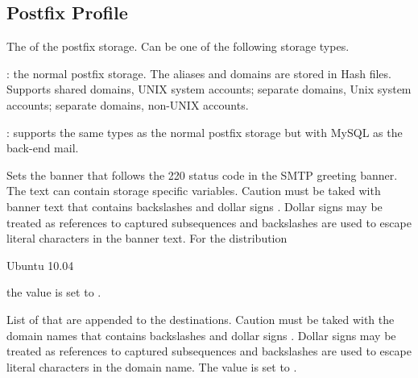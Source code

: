 \label{sec:postfix_profile}
\subsection{Postfix Profile}


The  of the postfix storage. Can be one of the following 
storage types.
\begin{asparaitem}
%
\item[\qcode{hash}:] 
the normal postfix storage. The aliases and domains are stored in Hash files.
Supports shared domains, UNIX system accounts;
separate domains, Unix system accounts; separate domains, non-UNIX accounts.
%
\item[\qcode{postfix}:] supports the same types as the normal 
postfix storage but with MySQL as the back-end mail.
%
\end{asparaitem}


Sets the banner  that follows the 220 status code in the SMTP 
greeting banner. The text can contain storage specific variables. Caution
must be taked with banner text that contains backslashes \qcode{\textbackslash} and 
dollar signs \qcode{\$}. Dollar signs may be treated as references to 
captured subsequences and backslashes are used to escape literal characters 
in the banner text.
For the distribution
\begin{inparaitem}
\item[\TheDistribution{ubuntu}] Ubuntu 10.04
\end{inparaitem}
the value is set to .


List of  that are appended to the destinations.
Caution must be taked with the domain names that contains backslashes \qcode{\textbackslash} and 
dollar signs \qcode{\$}. Dollar signs may be treated as references to 
captured subsequences and backslashes are used to escape literal characters  in the domain name.
The value is set to .

